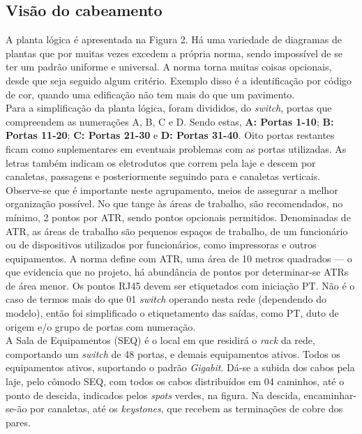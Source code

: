 \documentclass[	DIV=calc,%
							paper=a4,%
							fontsize=12pt,%
							onecolumn]{scrartcl}	 					%
\begin{document}
\subsection{Visão do cabeamento}
A planta lógica é apresentada na Figura 2. Há uma variedade de diagramas de plantas que por muitas vezes excedem a própria norma, sendo impossível de se ter um padrão uniforme e universal. A norma torna muitas coisas opcionais, desde que seja seguido algum critério. Exemplo disso é a identificação por código de cor, quando uma edificação não tem mais do que um pavimento.
\\

Para a simplificação da planta lógica, foram divididos, do \textit{switch}, portas que compreendem as numerações A, B, C e D. Sendo estas, \textbf{A: Portas 1-10}; \textbf{B: Portas 11-20}; \textbf{C: Portas 21-30} e \textbf{D: Portas 31-40}. Oito portas restantes ficam como suplementares em eventuais problemas com as portas utilizadas. As letras também indicam os eletrodutos que correm pela laje e descem por canaletas, passagens e posteriormente seguindo para e canaletas verticais. 
\\

Observe-se que é importante neste agrupamento, meios de assegurar a melhor organização possível. No que tange às áreas de trabalho, são recomendados, no mínimo, 2 pontos por ATR, sendo pontos opcionais permitidos. Denominadas de ATR, as áreas de trabalho são pequenos espaços de trabalho, de um funcionário ou de dispositivos utilizados por funcionários, como impressoras e outros equipamentos. A norma define com ATR, uma área de 10 metros quadrados --- o que evidencia que no projeto, há abundância de pontos por determinar-se ATRs de área menor. Os pontos RJ45 devem ser etiquetados com iniciação PT. Não é o caso de termos mais do que 01 \textit{switch} operando nesta rede (dependendo do modelo), então foi simplificado o etiquetamento das saídas, como PT, duto de origem e/o grupo de portas com numeração.
\\

A Sala de Equipamentos (SEQ) é o local em que residirá o \textit{rack} da rede, comportando um \textit{switch} de 48 portas, e demais equipamentos ativos. Todos os equipamentos ativos, suportando o padrão \textit{Gigabit}. Dá-se a subida dos cabos pela laje, pelo cômodo SEQ, com todos os cabos distribuídos em 04 caminhos, até o ponto de descida, indicados pelos \textit{spots} verdes, na figura. Na descida, encaminhar-se-ão por canaletas, até os \textit{keystones}, que recebem as terminações de cobre dos pares. 
\\
\end{document}
